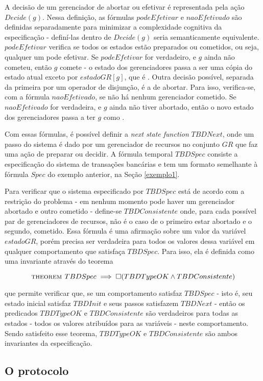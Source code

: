 A decisão de um gerenciador de abortar ou efetivar é representada pela ação
$Decide(g)$. Nessa definição, as fórmulas $podeEfetivar$ e $naoEfetivado$ são
definidas separadamente para minimizar a complexidade cognitiva da especificação
- definí-las dentro de $Decide(g)$ seria semanticamente equivalente.
$podeEfetivar$ verifica se todos os estados estão preparados ou cometidos, ou seja, qualquer um pode efetivar. Se $podeEfetivar$ for verdadeiro, e $g$ ainda não cometeu, então $g$ comete - o estado dos gerenciadores passa a ser uma cópia do estado atual exceto por $estadoGR[g]$, que é \cometido. Outra decisão possível, separada da primeira por um operador de disjunção, é a de abortar. Para isso, verifica-se, com a fórmula $naoEfetivado$, se não há nenhum gerenciador cometido. Se $naoEfetivado$ for verdadeira, e $g$ ainda não tiver abortado, então o novo estado dos gerenciadores passa a ter $g$ como \abortado.

Com essas fórmulas, é possível definir a \textit{next state function} $TBDNext$, onde um passo do sistema é dado por um gerenciador de recursos no conjunto $GR$ que faz uma ação de preparar ou decidir. A fórmula temporal $TBDSpec$ consiste a especificação do sistema de transações bancárias e tem um formato semelhante à fórmula $Spec$ do exemplo anterior, na Seção \ref{exemplo1}.

Para verificar que o sistema especificado por $TBDSpec$ está de acordo com a restrição do problema - em nenhum momento pode haver um gerenciador abortado e outro cometido - define-se $TBDConsistente$ onde, para cada possível par de gerenciadores de recursos, não é o caso de o primeiro estar abortado e o segundo, cometido. Essa fórmula é uma afirmação sobre um valor da variável $estadoGR$, porém precisa ser verdadeira para todos os valores dessa variável em qualquer comportamento que satisfaça $TBDSpec$. Para isso, ela é definida como uma invariante através do teorema

\[\textsc{theorem } TBDSpec \implies \square(TBDTypeOK \land TBDConsistente)\]

que permite verificar que, se um comportamento satisfaz $TBDSpec$ - isto é, seu
estado inicial satisfaz $TBDInit$ e seus passos satisfazem $TBDNext$ - então os
predicados $TBDTypeOK$ e $TBDConsistente$ são verdadeiros para todas as estados
- todos os valores atribuídos para as variáveis - neste comportamento. Sendo
satisfeito esse teorema, $TBDTypeOK$ e $TBDConsistente$ são ambos invariantes da especificação.

\subsection{O protocolo}
\label{sec:protocolo}

